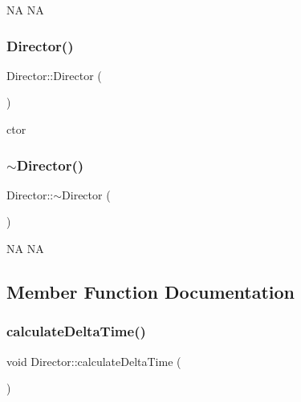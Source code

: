 NA  NA \mbox{\label{classDirector_a607a41fe5c42dd9ca7e256a11942a6d7}} 
\subsubsection{\texorpdfstring{Director()}{Director()}\hspace{0.1cm}{\footnotesize\ttfamily [2/2]}}
{\footnotesize\ttfamily Director\+::\+Director (\begin{DoxyParamCaption}{ }\end{DoxyParamCaption})}

ctor \mbox{\label{classDirector_a59d7a588bfd4edd22948a9e7fd8c854a}} 
\subsubsection{\texorpdfstring{$\sim$\+Director()}{~Director()}\hspace{0.1cm}{\footnotesize\ttfamily [2/2]}}
{\footnotesize\ttfamily Director\+::$\sim$\+Director (\begin{DoxyParamCaption}{ }\end{DoxyParamCaption})}

NA  NA 

\subsection{Member Function Documentation}
\mbox{\label{classDirector_a74f5e65404e0ce2d6336d52ce68640ac}} 
\subsubsection{\texorpdfstring{calculate\+Delta\+Time()}{calculateDeltaTime()}\hspace{0.1cm}{\footnotesize\ttfamily [1/2]}}
{\footnotesize\ttfamily void Director\+::calculate\+Delta\+Time (\begin{DoxyParamCaption}{ }\end{DoxyParamCaption})\hspace{0.3cm}{\ttfamily [protected]}}

